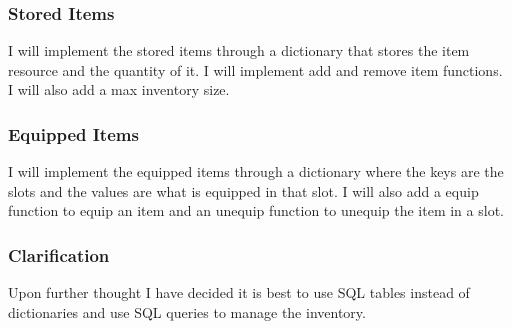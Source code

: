 \documentclass{article}
\begin{document}
        \subsubsection{Stored Items}
        I will implement the stored items through a dictionary that stores the item resource and the quantity of it. I will implement add and remove item functions. I will also add a max inventory size.\\
        \subsubsection{Equipped Items}
        I will implement the equipped items through a dictionary where the keys are the slots and the values are what is equipped in that slot. I will also add a equip function to equip an item and an unequip function to unequip the item in a slot.\\
        \subsubsection{Clarification}
        Upon further thought I have decided it is best to use SQL tables instead of dictionaries and use SQL queries to manage the inventory.\\
\end{document}
